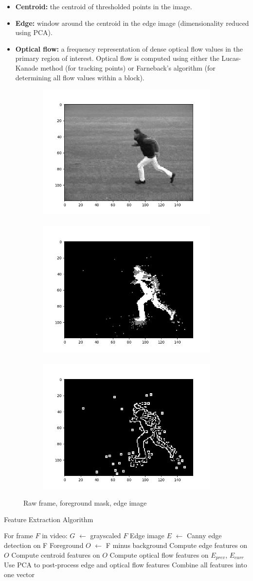 \documentclass{article}
\begin{document}
\begin{itemize}
    \item \textbf{Centroid:} the centroid of thresholded points in the image.
    \item \textbf{Edge:} window around the centroid in the edge image (dimensionality reduced using PCA).
    \item \textbf{Optical flow:} a frequency representation of dense optical flow values in the primary region of interest. Optical flow is computed using either the Lucas-Kanade method (for tracking points) or Farneback's algorithm (for determining all flow values within a block).
\end{itemize}

\begin{figure}[!b]
\centering
\begin{subfigure}[t]{\columnwidth}
\centering
\includegraphics[width=0.3\columnwidth]{frame_gray_1}~
\includegraphics[width=0.3\columnwidth]{fg_mask_1}~
\includegraphics[width=0.3\columnwidth]{edges_1}
\end{subfigure}
\caption{Raw frame, foreground mask, edge image}
\label{fig:images}
\end{figure}

\begin{algorithm}
\caption{Feature Extraction Algorithm}
\begin{algorithmic}[1]
\State For frame $F$ in video:
    \State \indent $G$ $\leftarrow$ grayscaled $F$
    \State \indent Edge image $E$ $\leftarrow$ Canny edge detection on F
    \State \indent Foreground $O$ $\leftarrow$ F minus background
    \State \indent Compute edge features on $O$
    \State \indent Compute centroid features on $O$
    \State \indent Compute optical flow features on $E_{prev}$, $E_{curr}$
\State Use PCA to post-process edge and optical flow features
\State Combine all features into one vector
\end{algorithmic}
\end{algorithm}
\end{document}
